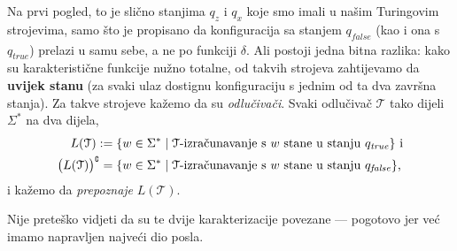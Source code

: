 Na prvi pogled, to je slično stanjima $q_z$ i $q_x$ koje smo imali u našim Turingovim strojevima, samo što je propisano da konfiguracija sa stanjem $q_{\mathit{false}}$ (kao i ona s $q_{\mathit{true}}$) prelazi u samu sebe, a ne po funkciji $\delta$. Ali postoji jedna bitna razlika: kako su karakteristične funkcije nužno totalne, od takvih strojeva zahtijevamo da \textbf{uvijek stanu} (za svaki ulaz dostignu konfiguraciju s jednim od ta dva završna stanja). Za takve strojeve kažemo da su \emph{odlučivači}. Svaki odlučivač $\mathcal T$ tako dijeli $\Sigma^*$ na dva dijela,
\begin{align}
    L(\mathcal T):=\{w\in\Sigma^*&\mid\text{$\mathcal T$-izračunavanje s $w$ stane u stanju $q_{\mathit{true}}$}\}
    \text{ i}\\ \bigl(L(\mathcal T)\big)\sp{{\scriptscriptstyle\complement}}=\{w\in\Sigma^*&\mid\text{$\mathcal T$-izračunavanje s $w$ stane u stanju $q_{\mathit{false}}$}\}\text,
\end{align} i kažemo da \emph{prepoznaje} $L(\mathcal T)$.

Nije preteško vidjeti da su te dvije karakterizacije povezane --- pogotovo jer već imamo napravljen najveći dio posla.

